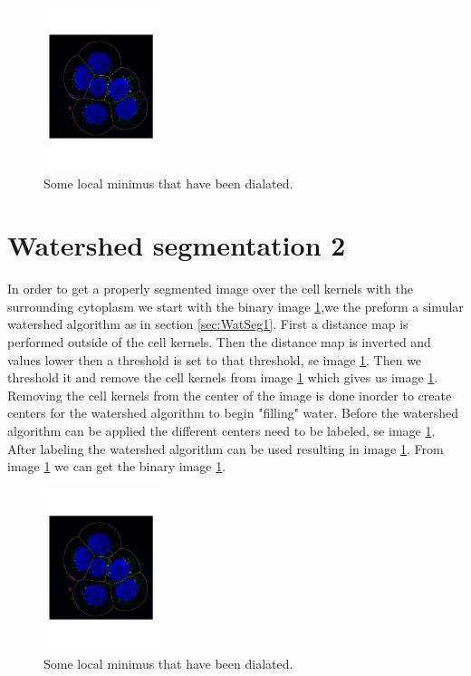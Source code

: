 \documentclass[10pt,twocolumn]{article}
\begin{document}
\begin{figure}[ht]
\centering
\includegraphics[width=0.3\textwidth]{Bilder/CellLinesNCircles.pdf}
\caption{Some local minimus that have been dialated.}
\label{fig:CellKernelsMinimumOpened}
\end{figure}


\section{Watershed segmentation 2}
In order to get a properly segmented image over the cell kernels with the
surrounding cytoplasm we start with the binary image \ref{},we the preform a
simular watershed algorithm as in section \ref{sec:WatSeg1}. First a distance
map is performed outside of the cell kernels. Then the distance map is
inverted and values lower then a threshold is set to that threshold, se image \ref{}.
Then we threshold it and remove the cell kernels from image \ref{} which gives us image \ref{}.
Removing the cell kernels from the center of the image is done inorder to create centers for the
watershed algorithm to begin "filling" water. Before the watershed algorithm can
be applied the different centers need to be labeled, se image \ref{}.
After labeling the watershed algorithm can be used resulting in image \ref{}.
From image \ref{} we can get the binary image \ref{}.

\begin{figure}[ht]
\centering
\includegraphics[width=0.3\textwidth]{Bilder/CellLinesNCircles.pdf}
\caption{Some local minimus that have been dialated.}
\label{fig:CellKernelsMinimumOpened}
\end{figure}
\end{document}
